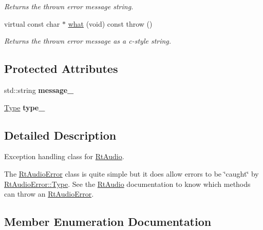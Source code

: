 \begin{DoxyCompactItemize}
\begin{DoxyCompactList}\small\item\em Returns the thrown error message string. \end{DoxyCompactList}\item 
virtual const char $\ast$ \hyperlink{class_rt_audio_error_aa0a4ebf95bcd3c6a6b1125bd5ad889da}{what} (void) const   throw ()\hypertarget{class_rt_audio_error_aa0a4ebf95bcd3c6a6b1125bd5ad889da}{}\label{class_rt_audio_error_aa0a4ebf95bcd3c6a6b1125bd5ad889da}

\begin{DoxyCompactList}\small\item\em Returns the thrown error message as a c-\/style string. \end{DoxyCompactList}\end{DoxyCompactItemize}
\subsection*{Protected Attributes}
\begin{DoxyCompactItemize}
\item 
std\+::string {\bfseries message\+\_\+}\hypertarget{class_rt_audio_error_a5d06eaff3db7c14db49084411b195f60}{}\label{class_rt_audio_error_a5d06eaff3db7c14db49084411b195f60}

\item 
\hyperlink{class_rt_audio_error_a85bdee746d5ba80d655ac98ded21d073}{Type} {\bfseries type\+\_\+}\hypertarget{class_rt_audio_error_ac0c3f1bca03feb57bbba1830aed0f6ad}{}\label{class_rt_audio_error_ac0c3f1bca03feb57bbba1830aed0f6ad}

\end{DoxyCompactItemize}


\subsection{Detailed Description}
Exception handling class for \hyperlink{class_rt_audio}{Rt\+Audio}. 

The \hyperlink{class_rt_audio_error}{Rt\+Audio\+Error} class is quite simple but it does allow errors to be \char`\"{}caught\char`\"{} by \hyperlink{class_rt_audio_error_a85bdee746d5ba80d655ac98ded21d073}{Rt\+Audio\+Error\+::\+Type}. See the \hyperlink{class_rt_audio}{Rt\+Audio} documentation to know which methods can throw an \hyperlink{class_rt_audio_error}{Rt\+Audio\+Error}. 

\subsection{Member Enumeration Documentation}
